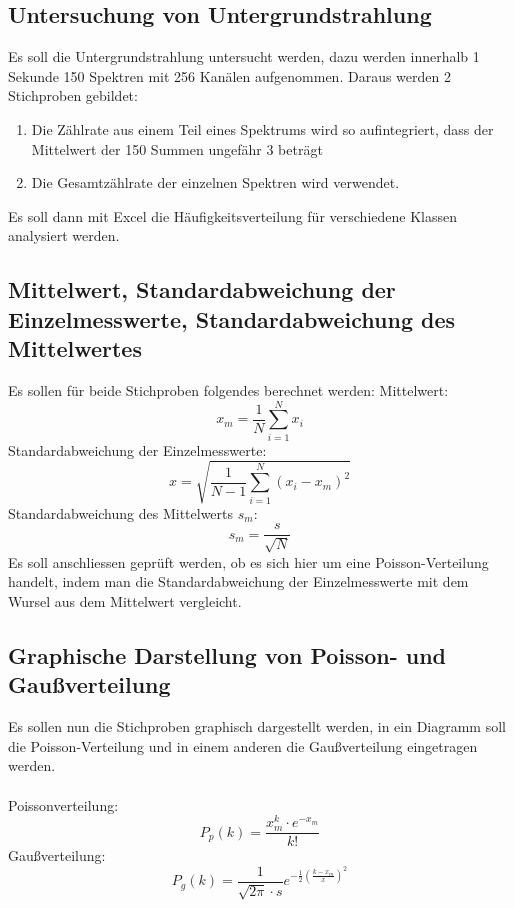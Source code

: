 \documentclass[a4paper,titlepage]{scrartcl}
\numberwithin{equation}{section}
\begin{document}
\subsection{Untersuchung von Untergrundstrahlung}
Es soll die Untergrundstrahlung untersucht werden, dazu werden innerhalb 1 Sekunde 150 Spektren mit 256 Kanälen aufgenommen. Daraus werden 2 Stichproben gebildet:
\begin{enumerate}
\item Die Zählrate aus einem Teil eines Spektrums wird so aufintegriert, dass der Mittelwert der 150 Summen ungefähr 3 beträgt
\item Die Gesamtzählrate der einzelnen Spektren wird verwendet.
\end{enumerate}
Es soll dann mit Excel die Häufigkeitsverteilung für verschiedene Klassen analysiert werden.
\subsection{Mittelwert, Standardabweichung der Einzelmesswerte, Standardabweichung des Mittelwertes}
Es sollen für beide Stichproben folgendes berechnet werden:
Mittelwert:
\begin{equation*}
x_m=\frac{1}{N} \sum_{i=1}^N x_i
\end{equation*}
Standardabweichung der Einzelmesswerte:
\begin{equation*}
x=\sqrt{\frac{1}{N - 1} \sum_{i=1}^N (x_i-x_m)^2}
\end{equation*}
Standardabweichung des Mittelwerts $s_m$:
\begin{equation*}
s_m=\frac{s}{\sqrt{N}}
\end{equation*}
Es soll anschliessen geprüft werden, ob es sich hier um eine Poisson-Verteilung handelt, indem man die Standardabweichung der Einzelmesswerte mit dem Wursel aus dem Mittelwert vergleicht.
\subsection{Graphische Darstellung von Poisson- und Gaußverteilung}
Es sollen nun die Stichproben graphisch dargestellt werden, in ein Diagramm soll die Poisson-Verteilung und in einem anderen die Gaußverteilung eingetragen werden.\\ \\
Poissonverteilung:
\begin{equation*}
P_p(k)=\frac{x^k_m \cdot e^{-x_m}}{k!}
\end{equation*}
Gaußverteilung:
\begin{equation*}
P_g(k)=\frac{1}{\sqrt{2 \pi} \cdot s}e^{-\frac{1}{2} \left( \frac{k-x_m}{x} \right)^2}
\end{equation*}
\end{document}
